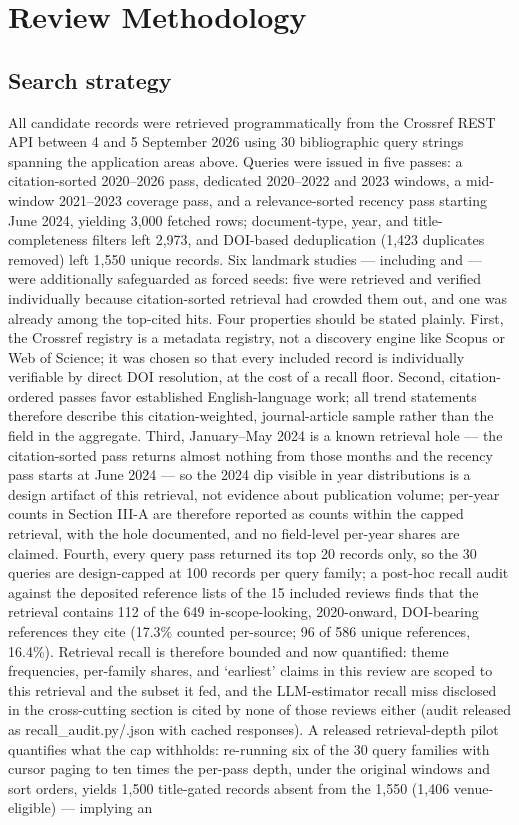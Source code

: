 \documentclass[journal]{IEEEtran}
\begin{document}
\section{Review Methodology}

\subsection{Search strategy}

All candidate records were retrieved programmatically from the Crossref REST API between 4 and 5 September 2026 using 30 bibliographic query strings spanning the application areas above. Queries were issued in five passes: a citation-sorted 2020--2026 pass, dedicated 2020--2022 and 2023 windows, a mid-window 2021--2023 coverage pass, and a relevance-sorted recency pass starting June 2024, yielding 3,000 fetched rows; document-type, year, and title-completeness filters left 2,973, and DOI-based deduplication (1,423 duplicates removed) left 1,550 unique records. Six landmark studies --- including \cite{r3} and \cite{r2} --- were additionally safeguarded as forced seeds: five were retrieved and verified individually because citation-sorted retrieval had crowded them out, and one was already among the top-cited hits. Four properties should be stated plainly. First, the Crossref registry is a metadata registry, not a discovery engine like Scopus or Web of Science; it was chosen so that every included record is individually verifiable by direct DOI resolution, at the cost of a recall floor. Second, citation-ordered passes favor established English-language work; all trend statements therefore describe this citation-weighted, journal-article sample rather than the field in the aggregate. Third, January--May 2024 is a known retrieval hole --- the citation-sorted pass returns almost nothing from those months and the recency pass starts at June 2024 --- so the 2024 dip visible in year distributions is a design artifact of this retrieval, not evidence about publication volume; per-year counts in Section III-A are therefore reported as counts within the capped retrieval, with the hole documented, and no field-level per-year shares are claimed. Fourth, every query pass returned its top 20 records only, so the 30 queries are design-capped at 100 records per query family; a post-hoc recall audit against the deposited reference lists of the 15 included reviews finds that the retrieval contains 112 of the 649 in-scope-looking, 2020-onward, DOI-bearing references they cite (17.3\% counted per-source; 96 of 586 unique references, 16.4\%). Retrieval recall is therefore bounded and now quantified: theme frequencies, per-family shares, and `earliest' claims in this review are scoped to this retrieval and the subset it fed, and the LLM-estimator recall miss disclosed in the cross-cutting section is cited by none of those reviews either (audit released as recall\_audit.py/.json with cached responses). A released retrieval-depth pilot quantifies what the cap withholds: re-running six of the 30 query families with cursor paging to ten times the per-pass depth, under the original windows and sort orders, yields 1,500 title-gated records absent from the 1,550 (1,406 venue-eligible) --- implying an 
\end{document}
